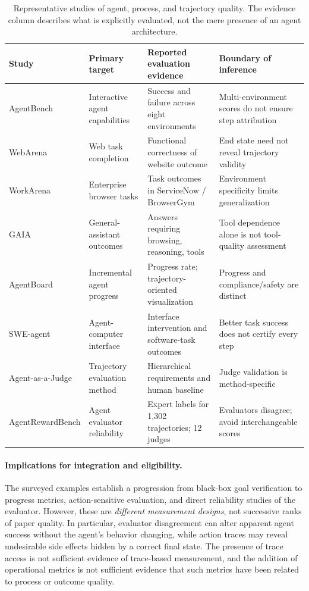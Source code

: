 \begin{table}[t]
\centering
\footnotesize
\caption{Representative studies of agent, process, and trajectory quality. The evidence column describes what is explicitly evaluated, not the mere presence of an agent architecture.}
\label{tab:agent-process-studies}
\begin{tabular}{p{} p{} p{} p{}}
\toprule
\textbf{Study} & \textbf{Primary target} & \textbf{Reported evaluation evidence} & \textbf{Boundary of inference} \\
\midrule
AgentBench \cite{liu2024agentbench} & Interactive agent capabilities & Success and failure across eight environments & Multi-environment scores do not ensure step attribution \\
WebArena \cite{zhou2024webarena} & Web task completion & Functional correctness of website outcome & End state need not reveal trajectory validity \\
WorkArena \cite{drouin2024workarena} & Enterprise browser tasks & Task outcomes in ServiceNow / BrowserGym & Environment specificity limits generalization \\
GAIA \cite{mialon2024gaia} & General-assistant outcomes & Answers requiring browsing, reasoning, tools & Tool dependence alone is not tool-quality assessment \\
AgentBoard \cite{ma2024agentboard} & Incremental agent progress & Progress rate; trajectory-oriented visualization & Progress and compliance/safety are distinct \\
SWE-agent \cite{yang2024sweagent} & Agent-computer interface & Interface intervention and software-task outcomes & Better task success does not certify every step \\
Agent-as-a-Judge \cite{zhuge2025agentjudge} & Trajectory evaluation method & Hierarchical requirements and human baseline & Judge validation is method-specific \\
AgentRewardBench \cite{lu2025agentrewardbench} & Agent evaluator reliability & Expert labels for 1,302 trajectories; 12 judges & Evaluators disagree; avoid interchangeable scores \\
\bottomrule
\end{tabular}
\end{table}

\paragraph{Implications for integration and eligibility.}
The surveyed examples establish a progression from black-box goal verification to progress metrics, action-sensitive evaluation, and direct reliability studies of the evaluator. However, these are \emph{different measurement designs}, not successive ranks of paper quality. In particular, evaluator disagreement can alter apparent agent success without the agent's behavior changing, while action traces may reveal undesirable side effects hidden by a correct final state. The presence of trace access is not sufficient evidence of trace-based measurement, and the addition of operational metrics is not sufficient evidence that such metrics have been related to process or outcome quality.

